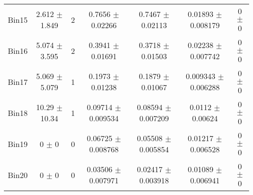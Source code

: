 \begin{tabular}{@{\extracolsep{4pt}}lcccccc@{}}
     Bin15 & 2.612 $\pm$ 1.849 & 2 & 0.7656 $\pm$ 0.02266 & 0.7467 $\pm$ 0.02113 & 0.01893 $\pm$ 0.008179 & 0 $\pm$ 0 \\ 
     Bin16 & 5.074 $\pm$ 3.595 & 2 & 0.3941 $\pm$ 0.01691 & 0.3718 $\pm$ 0.01503 & 0.02238 $\pm$ 0.007742 & 0 $\pm$ 0 \\ 
     Bin17 & 5.069 $\pm$ 5.079 & 1 & 0.1973 $\pm$ 0.01238 & 0.1879 $\pm$ 0.01067 & 0.009343 $\pm$ 0.006288 & 0 $\pm$ 0 \\ 
     Bin18 & 10.29 $\pm$ 10.34 & 1 & 0.09714 $\pm$ 0.009534 & 0.08594 $\pm$ 0.007209 & 0.0112 $\pm$ 0.00624 & 0 $\pm$ 0 \\ 
     Bin19 & 0 $\pm$ 0 & 0 & 0.06725 $\pm$ 0.008768 & 0.05508 $\pm$ 0.005854 & 0.01217 $\pm$ 0.006528 & 0 $\pm$ 0 \\ 
     Bin20 & 0 $\pm$ 0 & 0 & 0.03506 $\pm$ 0.007971 & 0.02417 $\pm$ 0.003918 & 0.01089 $\pm$ 0.006941 & 0 $\pm$ 0 \\ 
\hline\hline
  \end{tabular}

